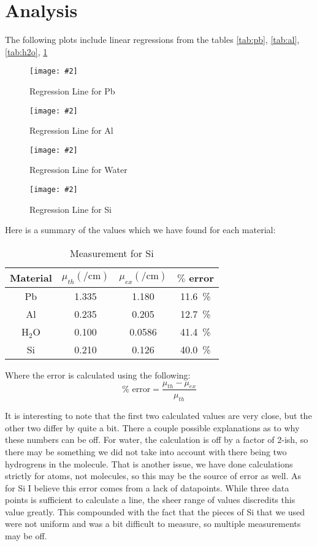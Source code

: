 \documentclass[letterpaper,12pt]{article}
\newcommand{\labfig}[4]{
  \begin{figure}[H]
    \centering
    \texttt{[image: \#2]}
    \caption{#3}
    \label{#4}
  \end{figure}}
\begin{document}
\section{Analysis}
The following plots include linear regressions from the tables \ref{tab:pb}, \ref{tab:al}, \ref{tab:h2o}, \ref{tab:si}
\labfig{12}{PbPlot}{Regression Line for Pb}{fig:pbplot}
\labfig{12}{AlPlot}{Regression Line for Al}{fig:alplot}
\labfig{13.5}{H2OPlot}{Regression Line for Water}{fig:h2oplot}
\labfig{13.5}{SiPlot}{Regression Line for Si}{fig:siplot}
Here is a summary of the values which we have found for each material:
\begin{table}[H]
  \centering
  \begin{tabular}{cccc}
    \hline
    Material & $\mu_{th} (\si{\per\cm})$ & $\mu_{ex} (\si{\per\cm})$ & $\%$ error
    \\ \hline
    Pb       & 1.335 & 1.180  & \SI{11.6}{\percent} \\
    Al       & 0.235 & 0.205  & \SI{12.7}{\percent} \\
    H$_2$O   & 0.100 & 0.0586 & \SI{41.4}{\percent} \\
    Si       & 0.210 & 0.126  & \SI{40.0}{\percent} \\
    \hline
  \end{tabular}
  \caption{Measurement for Si}
  \label{tab:si}
\end{table}
Where the error is calculated using the following:
\begin{equation}
  \label{eq:err}
  \% \text{ error} = \frac{\mu_{th}-\mu_{ex}}{\mu_{th}}
\end{equation}

It is interesting to note that the first two calculated values are very close, but the other two differ by quite a bit. There a couple possible explanations as to why these numbers can be off. For water, the calculation is off by a factor of 2-ish, so there may be something we did not take into account with there being two hydrogrens in the molecule. That is another issue, we have done calculations strictly for atoms, not molecules, so this may be the source of error as well. As for Si I believe this error comes from a lack of datapoints. While three data points is sufficient to calculate a line, the sheer range of values discredits this value greatly. This compounded with the fact that the pieces of Si that we used were not uniform and was a bit difficult to measure, so multiple measurements may be off. 
\end{document}
